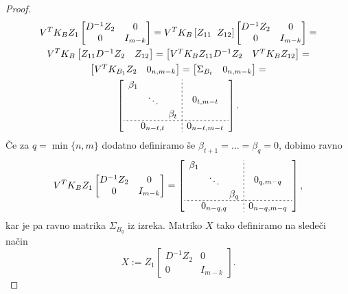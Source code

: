 \documentclass[mat1]{article}
\theoremstyle{definition}
\begin{document}
\begin{proof}
\begin{gather*}
V^T K_B Z_1
\begin{bmatrix}
D^{-1} Z_2 & 0\\ 
0 & I_{m-k}
\end{bmatrix} = 
V^T K_B \left[ Z_{11} \hspace{2mm} Z_{12} \right]
\begin{bmatrix}
D^{-1} Z_2 & 0\\ 
0 & I_{m-k}
\end{bmatrix} = \\
V^T K_B
\begin{bmatrix}
 Z_{11} D^{-1} Z_2 & Z_{12} 
\end{bmatrix} =
\begin{bmatrix}
V^T K_B Z_{11} D^{-1} Z_2 & V^T K_B Z_{12} 
\end{bmatrix} = \\
\begin{bmatrix}
V^T K_{B_1} Z_2 & 0_{n, m-k} 
\end{bmatrix} =
\begin{bmatrix}
\Sigma_{B_t} & 0_{n, m-k} 
\end{bmatrix} = \\
\left[
\begin{array}{c;{2pt/2pt}c}
\begin{matrix}
\beta_1 & & \\
 & \ddots & \\
 & & \beta_t
\end{matrix} & 0_{t, m - t}
 \\ \hdashline[2pt/2pt]
0_{n-t, t} & 0_{n-t, m-t}
\end{array} \right]
\text{.}
\end{gather*}
Če za $q = \min\{n,m\}$ dodatno definiramo še $\beta_{t+1} = \ldots = \beta_{q} = 0$, dobimo ravno
\begin{gather*}
V^T K_B Z_1
\begin{bmatrix}
D^{-1} Z_2 & 0\\ 
0 & I_{m-k}
\end{bmatrix} = 
\left[
\begin{array}{c;{2pt/2pt}c}
\begin{matrix}
\beta_1 & & \\
 & \ddots & \\
 & & \beta_q
\end{matrix} & 0_{q, m - q}
 \\ \hdashline[2pt/2pt]
0_{n-q, q} & 0_{n-q, m-q}
\end{array} \right]
\text{,}
\end{gather*}
kar je pa ravno matrika $\Sigma_{B_q}$ iz izreka. Matriko $X$ tako definiramo na sledeči način
$$ X := Z_1 
\begin{bmatrix}
D^{-1} Z_2 & 0\\ 
0 & I_{m-k}
\end{bmatrix}
\text{.}$$


\end{proof}
\end{document}
